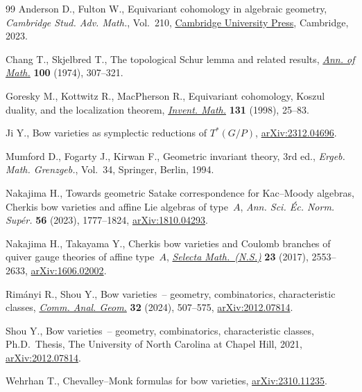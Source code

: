 \documentclass[11pt]{article}
\numberwithin{equation}{section}
\begin{document}
\begin{thebibliography}{99}
Anderson D., Fulton W., Equivariant cohomology in algebraic geometry,
 \textit{Cambridge Stud. Adv. Math.}, Vol.~210, \href{https://doi.org/10.1017/9781009349994}{Cambridge University Press},
 Cambridge, 2023.

Chang T., Skjelbred T., The topological {S}chur lemma and related results,
 \href{https://doi.org/10.2307/1971074}{\textit{Ann. of Math.}} \textbf{100} (1974), 307--321.

Goresky M., Kottwitz R., MacPherson R., Equivariant cohomology, {K}oszul
 duality, and the localization theorem, \href{https://doi.org/10.1007/s002220050197}{\textit{Invent. Math.}} \textbf{131}
 (1998), 25--83.

Ji Y., Bow varieties as symplectic reductions of {$T^*(G/P)$},
 \href{https://arxiv.org/abs/2312.04696}{arXiv:2312.04696}.

Mumford D., Fogarty J., Kirwan F., Geometric invariant theory, 3rd ed., \textit{Ergeb.
 Math. Grenzgeb.}, Vol.~34, Springer, Berlin, 1994.

Nakajima H., Towards geometric {S}atake correspondence for {K}ac--{M}oody
 algebras, {C}herkis bow varieties and affine {L}ie algebras of type~{$A$},
 \textit{Ann. Sci. \'Ec. Norm. Sup\'er.} \textbf{56} (2023), 1777--1824,
 \href{https://arxiv.org/abs/1810.04293}{arXiv:1810.04293}.

Nakajima H., Takayama Y., Cherkis bow varieties and {C}oulomb branches of
 quiver gauge theories of affine type~{$A$}, \href{https://doi.org/10.1007/s00029-017-0341-7}{\textit{Selecta Math.~(N.S.)}}
 \textbf{23} (2017), 2553--2633, \href{https://arxiv.org/abs/1606.02002}{arXiv:1606.02002}.

Rim\'anyi R., Shou Y., Bow varieties~-- geometry, combinatorics, characteristic
 classes, \href{https://doi.org/10.4310/cag.241015012209}{\textit{Comm. Anal. Geom.}} \textbf{32} (2024), 507--575,
 \href{https://arxiv.org/abs/2012.07814}{arXiv:2012.07814}.

Shou Y., Bow varieties~-- geometry, combinatorics, characteristic classes, Ph.D.~Thesis, {T}he {U}niversity of North Carolina at Chapel Hill, 2021,
 \href{https://arxiv.org/abs/2012.07814}{arXiv:2012.07814}.

Wehrhan T., {C}hevalley--{M}onk formulas for bow varieties,
 \href{https://arxiv.org/abs/2310.11235}{arXiv:2310.11235}.

\end{thebibliography}
\end{document}
